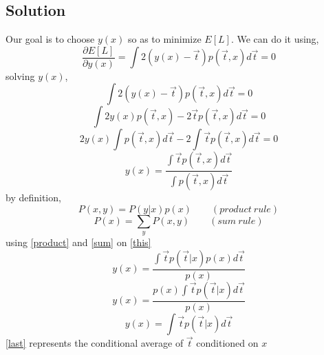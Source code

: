 \documentclass[a4 paper]{article}
\numberwithin{equation}{section}
\newcommand{\0}{\mathbf{0}}
\begin{document}
\subsection*{Solution}
Our goal is to choose $y(x)$ so as to minimize $E[L]$. We can do it using, 
\begin{equation}
\frac{\partial E[L]}{\partial y(x)} = \int 2(y(x)-\overrightarrow{t})p(\overrightarrow{t},x)d\overrightarrow{t} = 0
\end{equation}
solving $y(x)$,
\begin{equation}
\int 2(y(x)-\overrightarrow{t})p(\overrightarrow{t},x)d\overrightarrow{t} = 0
\end{equation}
\begin{equation}
\int 2y(x)p(\overrightarrow{t},x)-2\overrightarrow{t}p(\overrightarrow{t},x)d\overrightarrow{t} = 0
\end{equation}
\begin{equation}
2y(x)\int p(\overrightarrow{t},x)d\overrightarrow{t}-2\int\overrightarrow{t}p(\overrightarrow{t},x)d\overrightarrow{t} = 0
\end{equation}
\begin{equation}\label{this}
y(x) = \frac{\int \overrightarrow{t} p(\overrightarrow{t},x)d\overrightarrow{t}}{\int p(\overrightarrow{t},x)d\overrightarrow{t}}
\end{equation}
by definition,
\begin{equation}\label{product}
P(x,y) = P(y|x)p(x)\qquad (product\ rule)
\end{equation}
\begin{equation}\label{sum}
P(x) = \sum_y P(x,y)\qquad  (sum\ rule)
\end{equation}
using \ref{product} and \ref{sum} on \ref{this}
\begin{equation}
y(x) = \frac{\int \overrightarrow{t} p(\overrightarrow{t}|x)p(x)d\overrightarrow{t}}{p(x)}
\end{equation}
\begin{equation}
y(x) = \frac{p(x)\int \overrightarrow{t} p(\overrightarrow{t}|x)d\overrightarrow{t}}{p(x)}
\end{equation}
\begin{equation}\label{last}
y(x) = \int \overrightarrow{t} p(\overrightarrow{t}|x)d\overrightarrow{t}
\end{equation}
\ref{last} represents the conditional average of $\overrightarrow{t}$ conditioned on $x$
\end{document}
